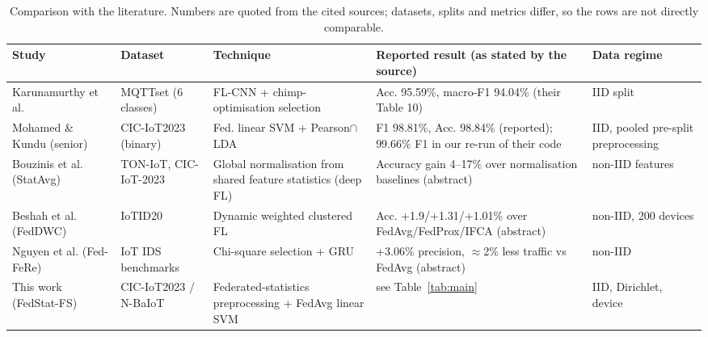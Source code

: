 \begin{table}[t]
\centering
\caption{Comparison with the literature. Numbers are quoted from the cited sources; datasets, splits and metrics differ, so the rows are not directly comparable.}
\label{tab:lit}
\tiny
\setlength{\tabcolsep}{2.4pt}
\begin{tabular}{p{2.6cm}p{1.9cm}p{2.8cm}p{4.2cm}p{2.0cm}}
\toprule
Study & Dataset & Technique & Reported result (as stated by the source) & Data regime \\
\midrule
Karunamurthy et al. \cite{karunamurthy2025} & MQTTset (6 classes) & FL-CNN + chimp-optimisation selection & Acc. 95.59\%, macro-F1 94.04\% (their Table 10) & IID split \\
Mohamed \& Kundu (senior) \cite{senior2026} & CIC-IoT2023 (binary) & Fed. linear SVM + Pearson$\cap$LDA & F1 98.81\%, Acc. 98.84\% (reported); 99.66\% F1 in our re-run of their code & IID, pooled pre-split preprocessing \\
Bouzinis et al. (StatAvg) \cite{bouzinis2025} & TON-IoT, CIC-IoT-2023 & Global normalisation from shared feature statistics (deep FL) & Accuracy gain 4--17\% over normalisation baselines (abstract) & non-IID features \\
Beshah et al. (FedDWC) \cite{fedDWC2025} & IoTID20 & Dynamic weighted clustered FL & Acc. +1.9/+1.31/+1.01\% over FedAvg/FedProx/IFCA (abstract) & non-IID, 200 devices \\
Nguyen et al. (Fed-FeRe) \cite{nguyen2026} & IoT IDS benchmarks & Chi-square selection + GRU & +3.06\% precision, $\approx$2\% less traffic vs FedAvg (abstract) & non-IID \\
This work (FedStat-FS) & CIC-IoT2023 / N-BaIoT & Federated-statistics preprocessing + FedAvg linear SVM & see Table~\ref{tab:main} & IID, Dirichlet, device \\
\bottomrule
\end{tabular}
\end{table}